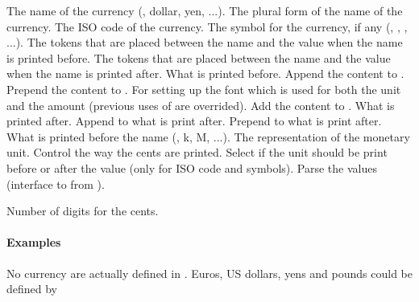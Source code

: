 \documentclass[12pt,add-index]{cnltx-doc}
\begin{document}
\begin{options}
     The name of the currency (\eg, dollar, yen, ...).
     The plural form of the name of the currency.
     The ISO code of the currency.
    \Default{\textcurrency} The symbol for the currency, if any (\eg, \cEUR[kind=symbol], \cUSD[kind=symbol], ...).
	The tokens that are placed between the name and the value when the name 
	is printed before. 
	The tokens that are placed between the name and the value when the name 
	is printed after. 
    \Default{} What is printed before. 
     Append the content to .
     Prepend the content to .
     For setting up the font which is used for both the unit and the amount (previous uses of  are overrided).
     Add the content to .
     What is printed after.
     Append to what is print after.
     Prepend to what is print after.
    \Default What is printed before the name (\eg, k, M, ...).
    The representation of the monetary unit.
    Control the way the cents are printed.
     Select if the unit should be print before or after the value (only for ISO code and symbols).
     Parse the values (interface to  from ).

     Number of digits for the cents.
\end{options}


\paragraph*{Examples}

No currency are actually defined in .
Euros, US dollars, yens and pounds could be defined by 
\begin{sourcecode}
\end{sourcecode}
\end{document}
